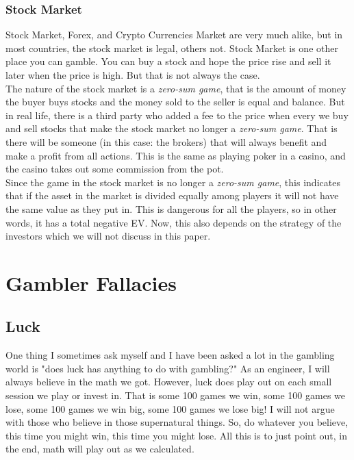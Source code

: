 \documentclass{article}
\begin{document}
\subsubsection{Stock Market}

Stock Market, Forex, and Crypto Currencies Market are very much alike, but in most countries, the stock market is legal, others not. Stock Market is one other place you can gamble.  You can buy a stock and hope the price rise and sell it later when the price is high.  But that is not always the case. \\

The nature of the stock market is a \emph{zero-sum game}, that is the amount of money the buyer buys stocks and the money sold to the seller is equal and balance.  But in real life, there is a third party who added a fee to the price when every we buy and sell stocks that make the stock market no longer a \emph{zero-sum game}.  That is there will be someone (in this case: the brokers) that will always benefit and make a profit from all actions.  This is the same as playing poker in a casino, and the casino takes out some commission from the pot.\\

Since the game in the stock market is no longer a \emph{zero-sum game}, this indicates that if the asset in the market is divided equally among players it will not have the same value as they put in.  This is dangerous for all the players, so in other words, it has a total negative EV.  Now, this also depends on the strategy of the investors which we will not discuss in this paper.\\

\clearpage
\section{Gambler Fallacies}

\subsection{Luck}
One thing I sometimes ask myself and I have been asked a lot in the gambling world is "does luck has anything to do with gambling?"  As an engineer, I will always believe in the math we got.  However, luck does play out on each small session we play or invest in.  That is some 100 games we win, some 100 games we lose, some 100 games we win big, some 100 games we lose big!  I will not argue with those who believe in those supernatural things.  So, do whatever you believe, this time you might win, this time you might lose.  All this is to just  point out, in the end, math will play out as we calculated.\par
\end{document}
